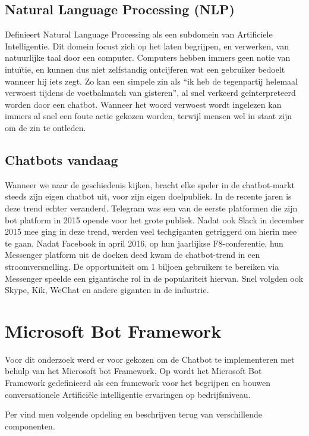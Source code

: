 \subsection{Natural Language Processing (NLP)}
\textcite{Seif2018} Definieert Natural Language Processing als een subdomein van Artificiele Intelligentie. Dit domein focust zich op het laten begrijpen, en verwerken, van natuurlijke taal door een computer. Computers hebben immers geen notie van intuïtie, en kunnen dus niet zelfstandig ontcijferen wat een gebruiker bedoelt wanneer hij iets zegt. Zo kan een simpele zin als “ik heb de tegenpartij helemaal verwoest tijdens de voetbalmatch van gisteren”, al snel verkeerd geïnterpreteerd worden door een chatbot. Wanneer het woord verwoest wordt ingelezen kan immers al snel een foute actie gekozen worden, terwijl mensen wel in staat zijn om de zin te ontleden.  

\subsection{Chatbots vandaag}
Wanneer we naar de geschiedenis kijken, bracht elke speler in de chatbot-markt steeds zijn eigen chatbot uit, voor zijn eigen doelpubliek. In de recente jaren is deze trend echter veranderd. Telegram was een van de eerste platformen die zijn bot platform in 2015 opende voor het grote publiek. Nadat ook Slack in december 2015 mee ging in deze trend, werden veel techgiganten getriggerd om hierin mee te gaan. Nadat Facebook in april 2016, op hun jaarlijkse F8-conferentie, hun Messenger platform uit de doeken deed kwam de chatbot-trend in een stroomversnelling. De opportuniteit om 1 biljoen gebruikers te bereiken  via Messenger speelde een gigantische rol in de populariteit hiervan. Snel volgden ook Skype, Kik, WeChat en andere giganten in de industrie. 

\section{Microsoft Bot Framework}
Voor dit onderzoek werd er voor gekozen om de Chatbot te implementeren met behulp van het Microsoft bot Framework. 
Op \textcite{Microsoft2019} wordt het Microsoft Bot Framework gedefinieerd als een framework voor het begrijpen en bouwen conversationele Artificiële intelligentie ervaringen op bedrijfsniveau. 

Per \textcite{delta-n2019} vind men volgende opdeling en beschrijven terug van verschillende componenten.

